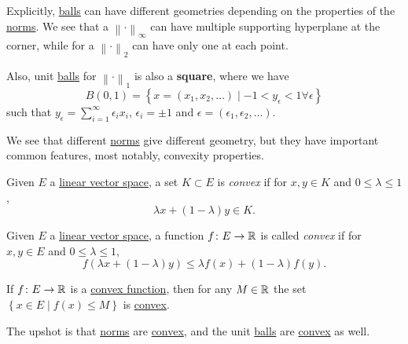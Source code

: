 Explicitly, \hyperref[def:ball]{balls} can have different geometries depending on the properties of the \hyperref[def:norm]{norms}. We see that a \(\left\lVert \cdot\right\rVert _{\infty}\) can have multiple supporting hyperplane at the corner, while for a \(\left\lVert \cdot\right\rVert _2\) can have only one at each point.

Also, unit \hyperref[def:ball]{balls} for \(\left\lVert \cdot\right\rVert _1\) is also a \textbf{square}, where we have
\[
	B(0, 1) = \left\{ x = (x_1, x_2, \ldots)\mid -1 < y_{\epsilon } < 1 \forall \epsilon\right\}
\]
such that \(y_{\epsilon } = \sum_{i=1}^{\infty} \epsilon _i x_i \), \(\epsilon _i = \pm 1\) and \(\epsilon = (\epsilon _1, \epsilon _2, \ldots  )\).

We see that different \hyperref[def:norm]{norms} give different geometry, but they have important common features, most notably, convexity properties.

\begin{definition}\label{def:convex-set}
	Given \(E\) a \hyperref[def:linear-vector-space]{linear vector space}, a set \(K\subset E\) is \emph{convex} if for \(x, y\in K\) and \(0 \leq \lambda \leq 1\),
	\[
		\lambda x + (1 - \lambda )y\in K.
	\]
\end{definition}

\begin{definition}\label{def:convex-function}
	Given \(E\) a \hyperref[def:linear-vector-space]{linear vector space}, a function \(f\colon E\to \mathbb{\MakeUppercase{r}} \) is called \emph{convex} if for \(x, y\in E\) and \(0 \leq \lambda \leq 1\),
	\[
		f(\lambda x + (1 - \lambda )y) \leq \lambda f(x) + (1 - \lambda )f(y).
	\]
\end{definition}

\begin{remark}
	If \(f\colon E \to \mathbb{\MakeUppercase{r}} \) is a \hyperref[def:convex-function]{convex function}, then for any \(M\in \mathbb{\MakeUppercase{r}} \) the set \(\left\{ x\in E\mid f(x) \leq M \right\} \) is \hyperref[def:convex-set]{convex}.
\end{remark}

The upshot is that \hyperref[def:norm]{norms} are \hyperref[def:convex-function]{convex}, and the unit \hyperref[def:ball]{balls} are \hyperref[def:convex-set]{convex} as well.
